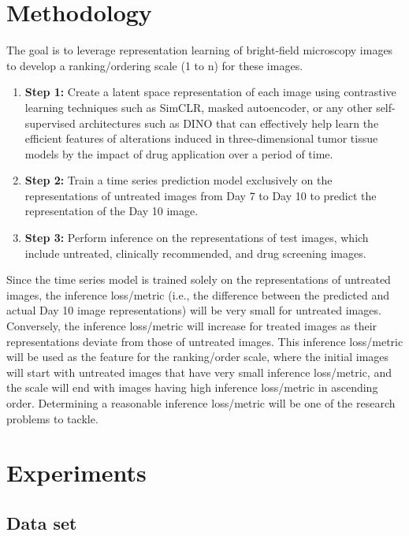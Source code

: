 \documentclass[12pt,twoside,a4paper,parskip]{scrbook} %
\begin{document}
\let\cleardoublepage\clearpage
\chapter{Methodology}\label{ch: Methodology}
The goal is to leverage representation learning of bright-field microscopy images to develop a ranking/ordering scale (1 to n) for these images. 

\begin{enumerate}
  \item \textbf{Step 1:} Create a latent space representation of each image using contrastive learning techniques such as SimCLR, masked autoencoder, or any other self-supervised architectures such as DINO that can effectively help learn the efficient features of alterations induced in three-dimensional tumor tissue models by the impact of drug application over a period of time.
  
  \item \textbf{Step 2:} Train a time series prediction model exclusively on the representations of untreated images from Day 7 to Day 10 to predict the representation of the Day 10 image.
  
  \item \textbf{Step 3:} Perform inference on the representations of test images, which include untreated, clinically recommended, and drug screening images.
\end{enumerate}

Since the time series model is trained solely on the representations of untreated images, the inference loss/metric (i.e., the difference between the predicted and actual Day 10 image representations) will be very small for untreated images. Conversely, the inference loss/metric will increase for treated images as their representations deviate from those of untreated images. This inference loss/metric will be used as the feature for the ranking/order scale, where the initial images will start with untreated images that have very small inference loss/metric, and the scale will end with images having high inference loss/metric in ascending order. Determining a reasonable inference loss/metric will be one of the research problems to tackle.

\chapter{Experiments}\label{ch:Experiments}
\section{Data set}
\label{sec:Data set}
\end{document}
